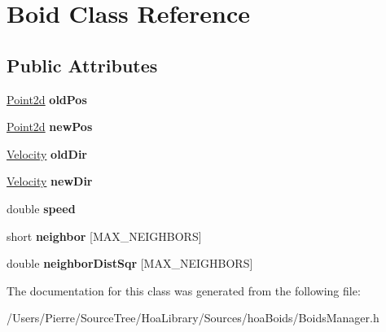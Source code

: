 \hypertarget{class_boid}{\section{Boid Class Reference}
\label{class_boid}
}
\subsection*{Public Attributes}
\begin{DoxyCompactItemize}
\item 
\hypertarget{class_boid_a6a26f158098e9669487c26d627bde7fd}{\hyperlink{struct_point2d}{Point2d} {\bfseries old\-Pos}}\label{class_boid_a6a26f158098e9669487c26d627bde7fd}

\item 
\hypertarget{class_boid_ae6d141e0fdcbe1aececb1d97ad048921}{\hyperlink{struct_point2d}{Point2d} {\bfseries new\-Pos}}\label{class_boid_ae6d141e0fdcbe1aececb1d97ad048921}

\item 
\hypertarget{class_boid_a059116c882d0452625f26b2cea15d13c}{\hyperlink{struct_velocity}{Velocity} {\bfseries old\-Dir}}\label{class_boid_a059116c882d0452625f26b2cea15d13c}

\item 
\hypertarget{class_boid_a84fb98fc48af20914e4df13c9b417125}{\hyperlink{struct_velocity}{Velocity} {\bfseries new\-Dir}}\label{class_boid_a84fb98fc48af20914e4df13c9b417125}

\item 
\hypertarget{class_boid_a513da5128b22c2584b345ad12ebc8963}{double {\bfseries speed}}\label{class_boid_a513da5128b22c2584b345ad12ebc8963}

\item 
\hypertarget{class_boid_a0390640c12693c5a9be97b302f51e877}{short {\bfseries neighbor} \mbox{[}M\-A\-X\-\_\-\-N\-E\-I\-G\-H\-B\-O\-R\-S\mbox{]}}\label{class_boid_a0390640c12693c5a9be97b302f51e877}

\item 
\hypertarget{class_boid_af1a381938e92b683c84724c40883bd4b}{double {\bfseries neighbor\-Dist\-Sqr} \mbox{[}M\-A\-X\-\_\-\-N\-E\-I\-G\-H\-B\-O\-R\-S\mbox{]}}\label{class_boid_af1a381938e92b683c84724c40883bd4b}

\end{DoxyCompactItemize}


The documentation for this class was generated from the following file\-:\begin{DoxyCompactItemize}
\item 
/\-Users/\-Pierre/\-Source\-Tree/\-Hoa\-Library/\-Sources/hoa\-Boids/Boids\-Manager.\-h\end{DoxyCompactItemize}
